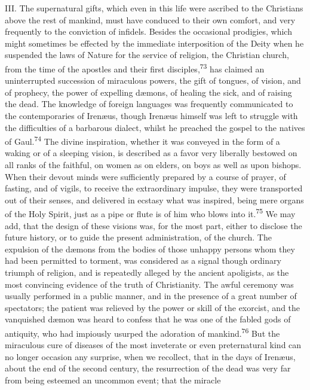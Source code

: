 III. The supernatural gifts, which even in this life were
ascribed to the Christians above the rest of mankind, must have
conduced to their own comfort, and very frequently to the
conviction of infidels. Besides the occasional prodigies, which
might sometimes be effected by the immediate interposition of the
Deity when he suspended the laws of Nature for the service of
religion, the Christian church, from the time of the apostles and
their first disciples,\textsuperscript{73} has claimed an uninterrupted succession
of miraculous powers, the gift of tongues, of vision, and of
prophecy, the power of expelling dæmons, of healing the sick, and
of raising the dead. The knowledge of foreign languages was
frequently communicated to the contemporaries of Irenæus, though
Irenæus himself was left to struggle with the difficulties of a
barbarous dialect, whilst he preached the gospel to the natives
of Gaul.\textsuperscript{74} The divine inspiration, whether it was conveyed in
the form of a waking or of a sleeping vision, is described as a
favor very liberally bestowed on all ranks of the faithful, on
women as on elders, on boys as well as upon bishops. When their
devout minds were sufficiently prepared by a course of prayer, of
fasting, and of vigils, to receive the extraordinary impulse,
they were transported out of their senses, and delivered in
ecstasy what was inspired, being mere organs of the Holy Spirit,
just as a pipe or flute is of him who blows into it.\textsuperscript{75} We may
add, that the design of these visions was, for the most part,
either to disclose the future history, or to guide the present
administration, of the church. The expulsion of the dæmons from
the bodies of those unhappy persons whom they had been permitted
to torment, was considered as a signal though ordinary triumph of
religion, and is repeatedly alleged by the ancient apoligists, as
the most convincing evidence of the truth of Christianity. The
awful ceremony was usually performed in a public manner, and in
the presence of a great number of spectators; the patient was
relieved by the power or skill of the exorcist, and the
vanquished dæmon was heard to confess that he was one of the
fabled gods of antiquity, who had impiously usurped the adoration
of mankind.\textsuperscript{76} But the miraculous cure of diseases of the most
inveterate or even preternatural kind can no longer occasion any
surprise, when we recollect, that in the days of Irenæus, about
the end of the second century, the resurrection of the dead was
very far from being esteemed an uncommon event; that the miracle
